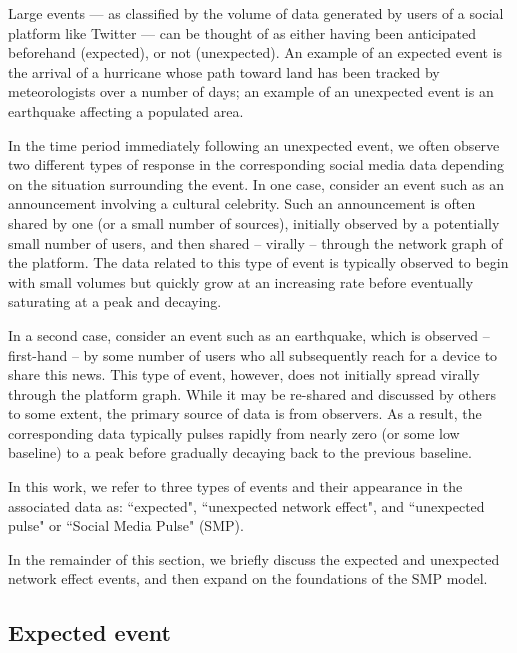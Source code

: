 \documentclass{article}
\begin{document}
Large events --- as classified by the volume of data generated by users of a social platform like Twitter --- can be thought of as either having been anticipated beforehand (expected), or not (unexpected). An example of an expected event is the arrival of a hurricane whose path toward land has been tracked by meteorologists over a number of days; an example of an unexpected event is an earthquake affecting a populated area. 

In the time period immediately following an unexpected event, we often observe two different types of response in the corresponding social media data depending on the situation surrounding the event. In one case, consider an event such as an announcement involving a cultural celebrity. Such an announcement is often shared by one (or a small number of sources), initially observed by a potentially small number of users, and then shared -- virally -- through the network graph of the platform. The data related to this type of event is typically observed to begin with small volumes but quickly grow at an increasing rate before eventually saturating at a peak and decaying. 

In a second case, consider an event such as an earthquake, which is observed -- first-hand -- by some number of users who all subsequently reach for a device to share this news. This type of event, however, does not initially spread virally through the platform graph. While it may be re-shared and discussed by others to some extent, the primary source of data is from observers. As a result, the corresponding data typically pulses rapidly from nearly zero (or some low baseline) to a peak before gradually decaying back to the previous baseline. 

In this work, we refer to three types of events and their appearance in the associated data as: ``expected", ``unexpected network effect", and ``unexpected pulse" or ``Social Media Pulse" (SMP). 

In the remainder of this section, we briefly discuss the expected and unexpected network effect events, and then expand on the foundations of the SMP model. 


\subsection{Expected event}
\label{sec:models_ex}
\end{document}
